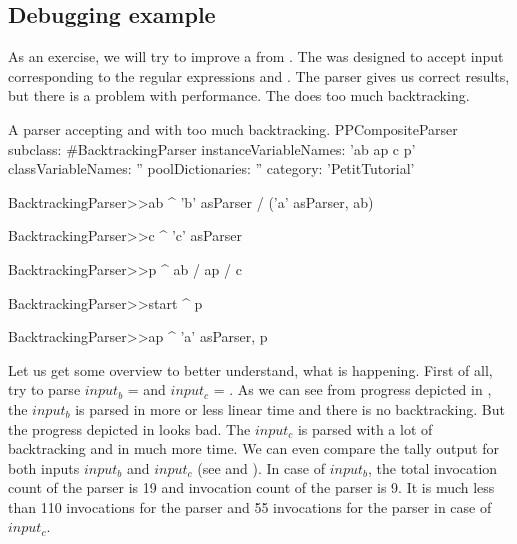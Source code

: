 \documentclass[a4paper,10pt,twoside]{book}
\begin{document}
\subsection{Debugging example}
  As an exercise, we will try to improve a  from . 
  The  was designed to accept input corresponding to the
  regular expressions  and .
  The parser gives us correct results, but there is a problem with performance.
  The  does too much backtracking.




\begin{script}{A parser accepting  and  with too much backtracking. \label{scr:pp/backtrackingParser}}
PPCompositeParser subclass: #BacktrackingParser
	instanceVariableNames: 'ab ap c p'
	classVariableNames: ''
	poolDictionaries: ''
	category: 'PetitTutorial'

BacktrackingParser>>ab
  ^  'b' asParser / 
     ('a' asParser, ab)

BacktrackingParser>>c
  ^ 'c' asParser

BacktrackingParser>>p
  ^ ab / ap / c

BacktrackingParser>>start
  ^ p


BacktrackingParser>>ap
  ^ 'a' asParser, p
\end{script}

Let us get some overview to better understand, what is happening.
First of all, try to parse $input_b$ =  and $input_c$ = .
As we can see from progress depicted in , the $input_b$ is parsed in more or less linear time and there is no backtracking.
But the progress depicted in  looks bad.
The $input_c$  is parsed with a lot of backtracking and in much more time.
We can even compare the tally output for both inputs $input_b$ and $input_c$ (see  and ).
In case of $input_b$, the total invocation count of the parser  is 19 and invocation count of the parser  is 9.
It is much less than 110 invocations for the parser  and 55 invocations for the parser  in case of $input_c$.
\end{document}
